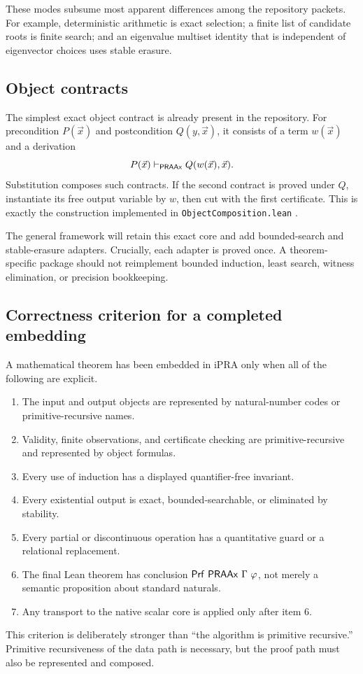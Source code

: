 These modes subsume most apparent differences among the repository packets.  For example, deterministic arithmetic is exact selection; a finite list of candidate roots is finite search; and an eigenvalue multiset identity that is independent of eigenvector choices uses stable erasure.

\subsection{Object contracts}

The simplest exact object contract is already present in the repository.  For precondition \(P(\vec{x})\) and postcondition \(Q(y,\vec{x})\), it consists of a term \(w(\vec{x})\) and a derivation
\[
   P(\vec{x})\vdash_{\mathsf{PRAAx}} Q(w(\vec{x}),\vec{x}).
\]
Substitution composes such contracts.  If the second contract is proved under \(Q\), instantiate its free output variable by \(w\), then cut with the first certificate.  This is exactly the construction implemented in \texttt{ObjectComposition.lean} \cite{repo-coherent}.

The general framework will retain this exact core and add bounded-search and stable-erasure adapters.  Crucially, each adapter is proved once.  A theorem-specific package should not reimplement bounded induction, least search, witness elimination, or precision bookkeeping.

\subsection{Correctness criterion for a completed embedding}

A mathematical theorem has been embedded in iPRA only when all of the following are explicit.

\begin{enumerate}
\item The input and output objects are represented by natural-number codes or primitive-recursive names.
\item Validity, finite observations, and certificate checking are primitive-recursive and represented by object formulas.
\item Every use of induction has a displayed quantifier-free invariant.
\item Every existential output is exact, bounded-searchable, or eliminated by stability.
\item Every partial or discontinuous operation has a quantitative guard or a relational replacement.
\item The final Lean theorem has conclusion \(\mathsf{Prf}\ \mathsf{PRAAx}\ \Gamma\ \varphi\), not merely a semantic proposition about standard naturals.
\item Any transport to the native scalar core is applied only after item 6.
\end{enumerate}

This criterion is deliberately stronger than ``the algorithm is primitive recursive.''  Primitive recursiveness of the data path is necessary, but the proof path must also be represented and composed.
